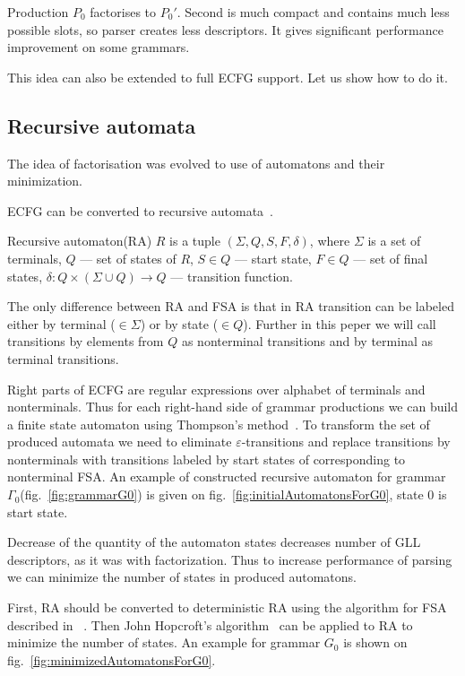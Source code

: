 \documentclass[runningheads,a4paper]{llncs}
\begin{document}
Production $P_0$ factorises to $P_0'$.
Second is much compact and contains much less possible slots, 
so parser creates less descriptors.
It gives significant performance improvement on some grammars.

This idea can also be extended to full ECFG support.
Let us show how to do it.

\subsection{Recursive automata}
The idea of factorisation was evolved to use of automatons and their minimization.

ECFG can be converted to recursive automata~\cite{tellier2006learning}.

\begin{mydef}
    Recursive automaton(RA) $R$ is a tuple $(\Sigma, Q, S, F, \delta)$, where
    $\Sigma$ is a set of terminals,
    $Q$ --- set of states of $R$,
    $S \in Q$ --- start state,
    $F \in Q$ --- set of final states,
    $\delta : Q \times (\Sigma \cup Q) \to Q$ --- transition function.
\end{mydef}

The only difference between RA and FSA is that in RA transition can be labeled either 
by terminal ($\in \Sigma$) or by state ($\in Q$). Further in this peper we will call
transitions by elements from $Q$ as nonterminal transitions and by terminal as terminal transitions.

Right parts of ECFG are regular expressions over alphabet of terminals and nonterminals.
Thus for each right-hand side of grammar productions we can build a finite state automaton 
using Thompson's method~\cite{Thompson:1968:PTR:363347.363387}. 
To transform the set of produced automata we need to eliminate $\varepsilon$-transitions and replace
transitions by nonterminals with transitions labeled by start states of corresponding to nonterminal FSA.
An example of constructed recursive automaton for grammar $\Gamma_{0}$(fig.~\ref{fig:grammarG0})
is given on fig.~\ref{fig:initialAutomatonsForG0}, state 0 is start state.

Decrease of the quantity of the automaton states decreases number of GLL descriptors, as it was with factorization.
Thus to increase performance of parsing we can minimize the number of states in produced automatons.

First, RA should be converted to deterministic RA using the algorithm for FSA described in ~\cite{aho1974design}.
Then John Hopcroft's algorithm~\cite{hopcroft1971n} can be applied to RA to minimize the number of states.
An example for grammar $G_0$ is shown on fig.~\ref{fig:minimizedAutomatonsForG0}.
\end{document}
